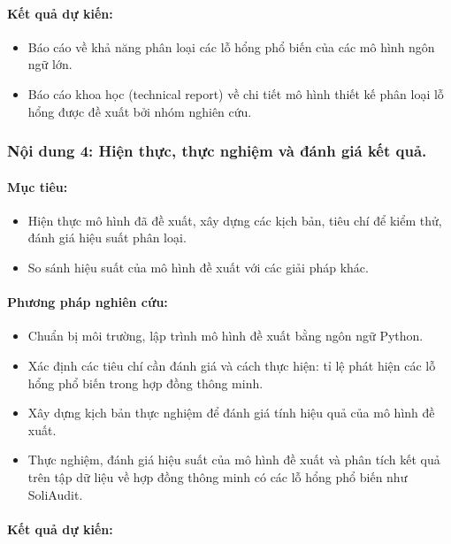 \documentclass[letterpaper]{article}
\begin{document}
\paragraph{Kết quả dự kiến:}

\begin{itemize}
    \item Báo cáo về khả năng phân loại các lỗ hổng phổ biến của các mô hình ngôn ngữ lớn.
    \item Báo cáo khoa học (technical report) về chi tiết mô hình thiết kế phân loại lỗ hổng được đề xuất bởi nhóm nghiên cứu.
\end{itemize}

\subsubsection{Nội dung 4: Hiện thực, thực nghiệm và đánh giá kết quả.}

\paragraph{Mục tiêu:}

\begin{itemize}
    \item Hiện thực mô hình đã đề xuất, xây dựng các kịch bản, tiêu chí để kiểm thử, đánh giá hiệu suất phân loại.
    \item So sánh hiệu suất của mô hình đề xuất với các giải pháp khác.
\end{itemize}

\paragraph{Phương pháp nghiên cứu:}

\begin{itemize}
    \item Chuẩn bị môi trường, lập trình mô hình đề xuất bằng ngôn ngữ Python.
    \item Xác định các tiêu chí cần đánh giá và cách thực hiện: tỉ lệ phát hiện các lỗ hổng phổ biến trong hợp đồng thông minh.
    \item Xây dựng kịch bản thực nghiệm để đánh giá tính hiệu quả của mô hình đề xuất.
    \item Thực nghiệm, đánh giá hiệu suất của mô hình đề xuất và phân tích kết quả trên tập dữ liệu về hợp đồng thông minh có các lỗ hổng phổ biến như SoliAudit.
\end{itemize}

\paragraph{Kết quả dự kiến:}
\end{document}
